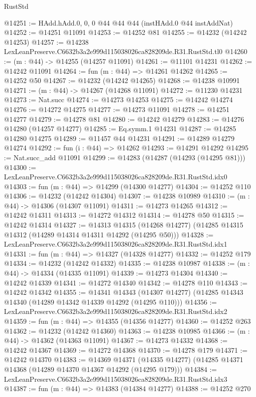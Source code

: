 \begin{lexlean}{RustStd}
\begin{coremodule}
@14251 := HAdd.hAdd.{0, 0, 0} @44 @44 @44 (instHAdd.{0} @44 instAddNat)
@14252 := @14251 @11091
@14253 := @14252 @81
@14255 := @14232 (@14242 @14253)
@14257 := @14238 LexLeanPreserve.C6632b3a2e999d115038026ca828209de.R31.RustStd.tl0
@14260 := (m : @44) -> @14255 (@14257 @11091)
@14261 := @11101 @14231
@14262 := @14242 @11091
@14264 := fun (m : @44) => @14261 @14262
@14265 := @14252 @50
@14267 := @14232 (@14242 @14265)
@14268 := @14238 @10991
@14271 := (m : @44) -> @14267 (@14268 @11091)
@14272 := @11230 @14231
@14273 := Nat.succ
@14274 := @14273 @14253
@14275 := @14242 @14274
@14276 := @14272 @14275
@14277 := @14273 @11091
@14278 := @14251 @14277
@14279 := @14278 @81
@14280 := @14242 @14279
@14283 := @14276 @14280 (@14257 @14277)
@14285 := Eq.symm.{1} @14231
@14287 := @14285 @14280 @14275
@14289 := @11457 @44 @14231
@14291 := @14289 @14279 @14274
@14292 := fun (i : @44) => @14262
@14293 := @14291 @14292
@14295 := Nat.succ_add @11091
@14299 := @14283 (@14287 (@14293 (@14295 @81)))
@14300 := LexLeanPreserve.C6632b3a2e999d115038026ca828209de.R31.RustStd.idx0
@14303 := fun (m : @44) => @14299 (@14300 @14277)
@14304 := @14252 @110
@14306 := @14232 (@14242 @14304)
@14307 := @14238 @10989
@14310 := (m : @44) -> @14306 (@14307 @11091)
@14311 := @14273 @14265
@14312 := @14242 @14311
@14313 := @14272 @14312
@14314 := @14278 @50
@14315 := @14242 @14314
@14327 := @14313
    @14315
    (@14268 @14277)
    (@14285 @14315 @14312 (@14289 @14314 @14311 @14292 (@14295 @50)))
@14328 := LexLeanPreserve.C6632b3a2e999d115038026ca828209de.R31.RustStd.idx1
@14331 := fun (m : @44) => @14327 (@14328 @14277)
@14332 := @14252 @179
@14334 := @14232 (@14242 @14332)
@14335 := @14238 @10987
@14338 := (m : @44) -> @14334 (@14335 @11091)
@14339 := @14273 @14304
@14340 := @14242 @14339
@14341 := @14272 @14340
@14342 := @14278 @110
@14343 := @14242 @14342
@14355 := @14341
    @14343
    (@14307 @14277)
    (@14285 @14343 @14340 (@14289 @14342 @14339 @14292 (@14295 @110)))
@14356 := LexLeanPreserve.C6632b3a2e999d115038026ca828209de.R31.RustStd.idx2
@14359 := fun (m : @44) => @14355 (@14356 @14277)
@14360 := @14252 @263
@14362 := @14232 (@14242 @14360)
@14363 := @14238 @10985
@14366 := (m : @44) -> @14362 (@14363 @11091)
@14367 := @14273 @14332
@14368 := @14242 @14367
@14369 := @14272 @14368
@14370 := @14278 @179
@14371 := @14242 @14370
@14383 := @14369
    @14371
    (@14335 @14277)
    (@14285 @14371 @14368 (@14289 @14370 @14367 @14292 (@14295 @179)))
@14384 := LexLeanPreserve.C6632b3a2e999d115038026ca828209de.R31.RustStd.idx3
@14387 := fun (m : @44) => @14383 (@14384 @14277)
@14388 := @14252 @270

\end{coremodule}
\end{lexlean}
